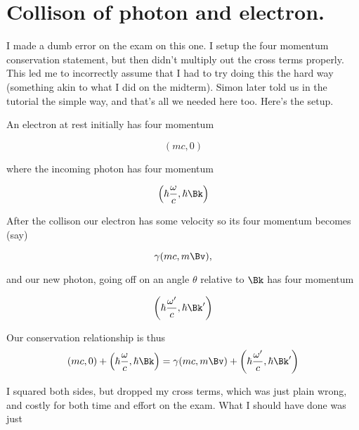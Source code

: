 \section{Collison of photon and electron.}

I made a dumb error on the exam on this one.  I setup the four momentum conservation statement, but then didn't multiply out the cross terms properly.  This led me to incorrectly assume that I had to try doing this the hard way (something akin to what I did on the midterm).  Simon later told us in the tutorial the simple way, and that's all we needed here too.  Here's the setup.

An electron at rest initially has four momentum

\begin{equation}\label{eqn:relativisticElectrodynamicsExamReflection:n}
(m c, 0)
\end{equation}

where the incoming photon has four momentum

\begin{equation}\label{eqn:relativisticElectrodynamicsExamReflection:n}
\left(\hbar \frac{\omega}{c}, \hbar \Bk \right)
\end{equation}

After the collison our electron has some velocity so its four momentum becomes (say)

\begin{equation}\label{eqn:relativisticElectrodynamicsExamReflection:n}
\gamma (m c, m \Bv),
\end{equation}

and our new photon, going off on an angle $\theta$ relative to $\Bk$ has four momentum

\begin{equation}\label{eqn:relativisticElectrodynamicsExamReflection:n}
\left(\hbar \frac{\omega'}{c}, \hbar \Bk' \right)
\end{equation}

Our conservation relationship is thus
\begin{equation}\label{eqn:relativisticElectrodynamicsExamReflection:n}
(m c, 0) + \left(\hbar \frac{\omega}{c}, \hbar \Bk \right)
=
\gamma (m c, m \Bv)
+
\left(\hbar \frac{\omega'}{c}, \hbar \Bk' \right)
\end{equation}

I squared both sides, but dropped my cross terms, which was just plain wrong, and costly for both time and effort on the exam.  What I should have done was just

